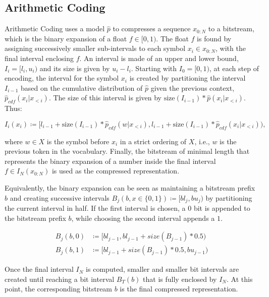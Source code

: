 \subsection{Arithmetic Coding}

Arithmetic Coding \cite{rissanenGeneralizedKraftInequality1976,pascoSourceCodingAlgorithms1977} uses a model $\hat{p}$ to compresses a sequence $x_{0:N}$ to a bitstream, which is the binary expansion of a float $f \in [0, 1)$. The float $f$ is found by assigning successively smaller sub-intervals to each symbol $x_i \in x_{0:N}$, with the final interval enclosing $f$. An interval is made of an upper and lower bound, $I_i = [l_i, u_i)$ and its size is given by $u_i - l_i$. Starting with $I_0 = [0, 1)$, at each step of encoding, the interval for the symbol $x_i$ is created by partitioning the interval $I_{i-1}$ based on the cumulative distribution of $\hat{p}$ given the previous context, $\hat{p}_{cdf}(x_i | x_{<i})$. The size of this interval is given by $\text{size}(I_{i-1}) * \hat{p}(x_i | x_{<i})$. Thus:

$$ I_i(x_i) \coloneqq \big[ l_{i-1} + \text{size}(I_{i-1}) * \hat{p}_{cdf}(w | x_{<i}),  l_{i-1} + \text{size}(I_{i-1}) * \hat{p}_{cdf}(x_i | x_{<i}) \big),
$$

where $w \in X$ is the symbol before $x_i$ in a strict ordering of $X$, i.e., $w$ is the previous token in the vocabulary. Finally, the bitstream of minimal length that represents the binary expansion of a number inside the final interval $f \in I_N(x_{0:N})$ is used as the compressed representation.

Equivalently, the binary expansion can be seen as maintaining a bitstream prefix $b$ and creating successive intervals $B_j(b, x \in \{0, 1\}) \coloneqq [bl_j, bu_j)$ by partitioning the current interval in half. If the first interval is chosen, a $0$ bit is appended to the bitstream prefix $b$, while choosing the second interval appends a $1$.

\begin{align*}
    B_j(b, 0) &\coloneqq \big[ bl_{j - 1}, bl_{j-1} + size(B_{j-1}) * 0.5 \big) \\
    B_j(b, 1) &\coloneqq \big[ bl_{j - 1} + size(B_{j-1}) * 0.5, bu_{j-1} \big)
\end{align*}

Once the final interval $I_N$ is computed, smaller and smaller bit intervals are created until reaching a bit interval $B_T(b)$ that is fully enclosed by $I_N$. At this point, the corresponding bitstream $b$ is the final compressed representation.

